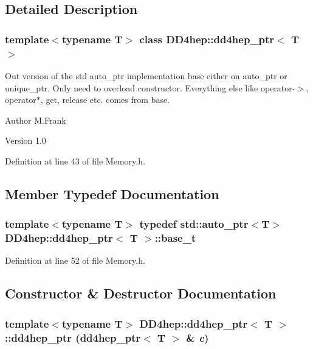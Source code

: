 \subsection{Detailed Description}
\subsubsection*{template$<$typename T$>$ class DD4hep::dd4hep\_\-ptr$<$ T $>$}

Out version of the std auto\_\-ptr implementation base either on auto\_\-ptr or unique\_\-ptr. Only need to overload constructor. Everything else like operator-\/$>$, operator$\ast$, get, release etc. comes from base.

\begin{DoxyAuthor}{Author}
M.Frank 
\end{DoxyAuthor}
\begin{DoxyVersion}{Version}
1.0 
\end{DoxyVersion}


Definition at line 43 of file Memory.h.

\subsection{Member Typedef Documentation}
\hypertarget{class_d_d4hep_1_1dd4hep__ptr_a4bcbed2d2a920d0a5ffbf405263fe8d6}{
\subsubsection[{base\_\-t}]{\setlength{\rightskip}{0pt plus 5cm}template$<$typename T$>$ typedef std::auto\_\-ptr$<${\bf T}$>$ {\bf DD4hep::dd4hep\_\-ptr}$<$ {\bf T} $>$::{\bf base\_\-t}}}
\label{class_d_d4hep_1_1dd4hep__ptr_a4bcbed2d2a920d0a5ffbf405263fe8d6}


Definition at line 52 of file Memory.h.

\subsection{Constructor \& Destructor Documentation}
\hypertarget{class_d_d4hep_1_1dd4hep__ptr_abac6ac3d2451af4916b051b66ed696ec}{
\subsubsection[{dd4hep\_\-ptr}]{\setlength{\rightskip}{0pt plus 5cm}template$<$typename T$>$ {\bf DD4hep::dd4hep\_\-ptr}$<$ {\bf T} $>$::{\bf dd4hep\_\-ptr} ({\bf dd4hep\_\-ptr}$<$ {\bf T} $>$ \& {\em c})}}
\label{class_d_d4hep_1_1dd4hep__ptr_abac6ac3d2451af4916b051b66ed696ec}


